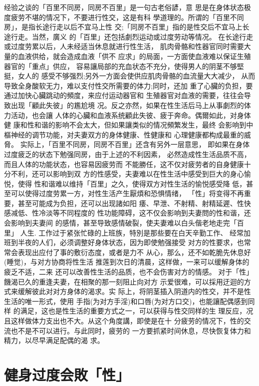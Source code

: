 \documentclass[12pt,UTF8]{ctexbook}
\begin{document}
经验之谈的「百里不同房，同房不百里」是一句古老俗諺，意
思是在身体状态极度疲劳不堪的情况下，不要进行性交，这是有科
學道理的。所谓的「百里不同房」，是指长途行走以后不宜马上性
交;「同房不百里」指的是性交后不宜马上长途行走。当然，廣义
的「百里」还包括劇烈运动或过度劳动等情况。
在长途行走或过度劳累以后，人未经适当休息就进行性生活，
肌肉骨骼和性器官同时需要大量的血液供给，就会造成血液「供不
应求」的局面，一方面使血液难以保证生殖器官的「重点」供应，
容易讓局部的充血状态不充分，使得男人的阴茎不够堅挺，女人的
感受不够强烈;另外一方面会使供应肌肉骨骼的血流量大大减少，
从而导致全身酸软无力，难以支付性交所需要的体力;同时，还加
重了心臟的负担，要通过加快心臟跳动的頻度，来应付运动器官和
生殖器官对血液的需要，往往会导致出现「顧此失彼」的尷尬境
况。反之亦然，如果在性生活后马上从事劇烈的体力活动，也会讓
人体的心臟和血液系统顧此失彼、疲于奔命。偶爾如此，对身体健
康和性和谐的影响不会太大，但如果讓类似的情况頻繁发生，最终
会影响到中樞神经的调节功能，对夫妻双方的身体健康、性健康和
心理健康都构成最重的威脅。
实际上，「百里不同房，同房不百里」还含有另外一层意思，
即如果在身体过度疲乏的状态下勉强同房，由于上述的不利因素，
必然造成性生活品质不高，而且人体的功能状态，也容易因疲劳而
不能勝任，这不仅对疲劳者的自身健康十分不利，还可以影响到双
方的性感受，夫妻难以在性生活中感受到巨大的身心愉悦，使得
性和谐难以维持「百里」之久，使得双方对性生活的愉悦感受降
低，甚至可以使得过度劳累一方，对性生活产生厭煩和恐惧情绪，
「性」将变得不再重要，甚至可能成为负担，还可以出现諸如阳
痿、早泄、不射精、射精延遲、性快感减低、性冷淡等不同程度的
性功能障碍，这不仅会影响到夫妻問的性和谐，还会影响到夫妻间
的感情，甚至导致感情破裂，使夫妻难以白头偕老地走完「百里」
人生.
工作过于紧张忙碌的上班族，特別是那些要在白天辛勤工作、
经常加班到半夜的人们，必须调整好身体状态，因为即使勉强接受
对方的性要求，也常常会表现出应付了事的敷衍态度，或者是力不
从心，那么，还不如乾脆先休息好(睡觉)，与对方协商将性生活
推莲到次日的清晨，这样做，一来可以缓解身体的疲乏不适，二来
还可以改善性生活的品质，也不会伤害对方的情感。
对于「性」饑渴已久的重逢夫妻，在相聚的那一刻阻止向对方
示爱很难，可以採用迂迴的方式来缓解彼此对对方身体的渴求。实
际上，将阴茎插入阴道内的性交，并不是性生活的唯一形式，使用
手指(为对方手淫)和口唇(为对方口交)，也能讓配偶感到同样
的满足，这也是性生活的重要方式之一，可以获得与性交同样的生
理反应，况且这样做体力支出也不大。从这个角度講，即使是在十
分疲劳的情况下，性的交流也不是不可以进行。与此同时，疲劳的
一方要抓紧时间休息，尽快恢复体力和精力，以尽早满足配偶的渴
求。

\section{健身过度会敗「性」}
\end{document}

